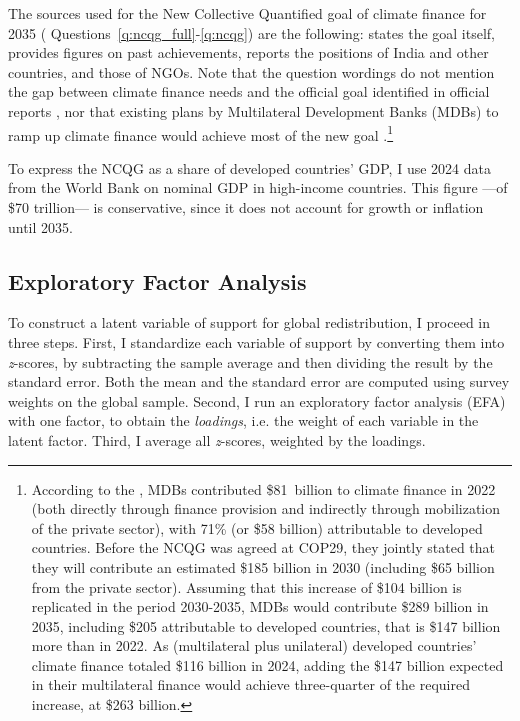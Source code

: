 The sources used for the New Collective Quantified goal of climate finance for 2035 (%
Questions~\ref{q:ncqg_full}-\ref{q:ncqg}) are the following: \cite{unfccc_new_2024} states the goal itself, \cite{oecd_climate_2024} provides figures on past achievements, \cite{earth_negotiations_bulletin_daily_2024} reports the positions of India and other countries, and \cite{climate_action_network_climate_2024,demand_climate_justice_engo-demand_2025} those of NGOs. Note that the question wordings do not mention the gap between climate finance needs and the official goal identified in official reports \citep{oecd_bridging_2024,songwe_raising_2024}, nor that existing plans by Multilateral Development Banks (MDBs) to ramp up climate finance would achieve most of the new goal \citep{mdbs_joint_2024}.\footnote{According to the  \cite{oecd_climate_2024}, MDBs contributed \$81~billion to climate finance in 2022 (both directly through finance provision and indirectly through mobilization of the private sector), with 71\% (or \$58 billion) attributable to developed countries. Before the NCQG was agreed at COP29, they jointly stated that they will contribute an estimated \$185 billion in 2030 (including \$65 billion from the private sector). Assuming that this increase of \$104 billion is replicated in the period 2030-2035, MDBs would contribute \$289 billion in 2035, including \$205 attributable to developed countries, that is \$147 billion more than in 2022. As (multilateral plus unilateral) developed countries' climate finance totaled \$116 billion in 2024, adding the \$147 billion expected in their multilateral finance would achieve three-quarter of the required increase, at \$263 billion.}

To express the NCQG as a share of developed countries' GDP, I use 2024 data from the World Bank on nominal GDP in high-income countries. This figure ---of \$70 trillion--- is conservative, since it does not account for growth or inflation until 2035.

\subsection*{Exploratory Factor Analysis}\label{subsec:efa}


To construct a latent variable of support for global redistribution, I proceed in three steps. First, I standardize each variable of support by converting them into \textit{z}-scores, by subtracting the sample average and then dividing the result by the standard error. Both the mean and the standard error are computed using survey weights on the global sample. 
Second, I run an exploratory factor analysis (EFA) with one factor, to obtain the \textit{loadings}, i.e. the weight of each variable in the latent factor. %
Third, I average all \textit{z}-scores, weighted by the loadings. 

